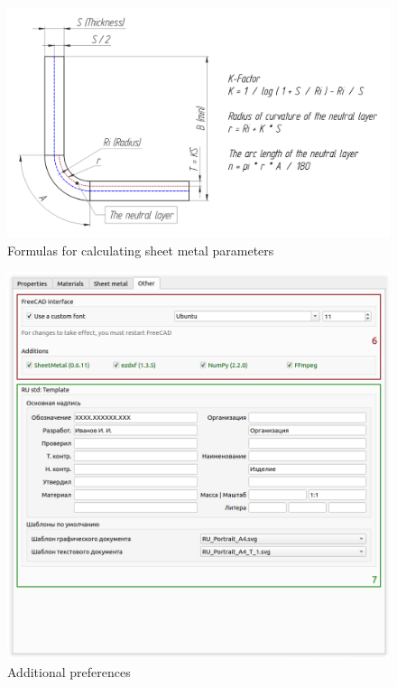 \documentclass[a4paper,12pt]{article}
\begin{document}
\begin{figure}[htp]
	\centering
	\includegraphics[width=1\textwidth]{img/k_en.png}
	\caption{Formulas for calculating sheet metal parameters}
	\label{sec:k}
\end{figure}

\pagebreak




\begin{figure}[htp]
	\centering
	\includegraphics[width=1\textwidth]{img/pref_other.png}
	\caption{Additional preferences}
	\label{sec:pref_other}
\end{figure}
\end{document}
